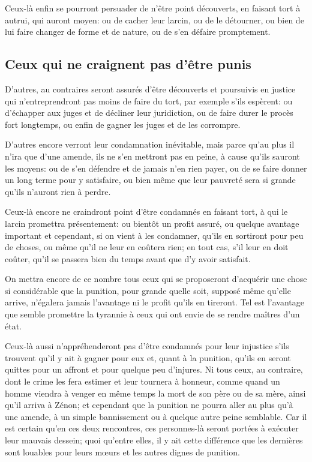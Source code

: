Ceux-là enfin se pourront persuader de n'être point découverts, en faisant tort à autrui, qui auront moyen: ou
de cacher leur larcin, ou de le détourner, ou bien de lui faire changer de forme et de nature, ou de s'en défaire
promptement.

\subsection{Ceux qui ne craignent pas d'être punis}

D'autres, au contraires seront assurés d'être découverts et poursuivis en justice qui n'entreprendront pas moins
de faire du tort, par exemple s'ils espèrent: ou d'échapper aux juges et de décliner leur juridiction, ou de
faire durer le procès fort longtemps, ou enfin de gagner les juges et de les corrompre.

\bigbreak

D'autres encore verront leur condamnation inévitable, mais parce qu'au plus il n'ira que d'une amende, ils ne s'en
mettront pas en peine, à cause qu'ils sauront les moyens: ou de s'en défendre et de jamais n'en rien payer, ou de
se faire donner un long terme pour y satisfaire, ou bien même que leur pauvreté sera si grande qu'ils n'auront rien
à perdre.

Ceux-là encore ne craindront point d'être condamnés en faisant tort, à qui le larcin promettra présentement: ou
bientôt un profit assuré, ou quelque avantage important et cependant, si on vient à les condamner, qu'ils en
sortiront pour peu de choses, ou même qu'il ne leur en coûtera rien; en tout cas, s'il leur en doit coûter, qu'il
se passera bien du temps avant que d'y avoir satisfait. 

On mettra encore de ce nombre tous ceux qui se proposeront d'acquérir une chose si considérable que la punition,
pour grande quelle soit, supposé même qu'elle arrive, n'égalera jamais l'avantage ni le profit qu'ils en tireront.
Tel est l'avantage que semble promettre la tyrannie à ceux qui ont envie de se rendre maîtres d'un état.

Ceux-là aussi n'appréhenderont pas d'être condamnés pour leur injustice s'ils trouvent qu'il y ait à gagner pour
eux et, quant à la punition, qu'ils en seront quittes pour un affront et pour quelque peu d'injures. Ni tous ceux,
au contraire, dont le crime les fera estimer et leur tournera à honneur, comme quand un homme viendra à venger en
même temps la mort de son père ou de sa mère, ainsi qu'il arriva à Zénon; et cependant que la punition ne pourra
aller au plus qu'à une amende, à un simple bannissement ou à quelque autre peine semblable. Car il est certain
qu'en ces deux rencontres, ces personnes-là seront portées à exécuter leur mauvais dessein; quoi qu'entre elles,
il y ait cette différence que les dernières sont louables pour leurs mœurs et les autres dignes de punition.

